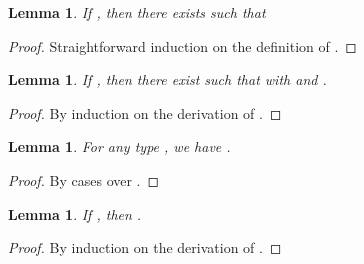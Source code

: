 \documentclass[preprint]{elsarticle}
\newtheorem{lemma}[theorem]{Lemma}
\begin{document}
\begin{lemma}\label{lem:noBasisPrec}
  If , then there exists  such that 
\end{lemma}
\begin{proof}
  Straightforward induction on the definition of .
\end{proof}

\begin{lemma}\label{lem:SAxBmE}
  If , then there exist  such that
   with  and .
\end{lemma}
\begin{proof}
  By induction on the derivation of .
\end{proof}
\begin{lemma}\label{lem:minlqA}
          For any type , we have .
        \end{lemma}
        \begin{proof}
          By cases over .
        \end{proof}
        \begin{lemma}\label{lem:minS}
          If , then .
        \end{lemma}
        \begin{proof}
          By induction on the derivation of .
        \end{proof}
\end{document}
